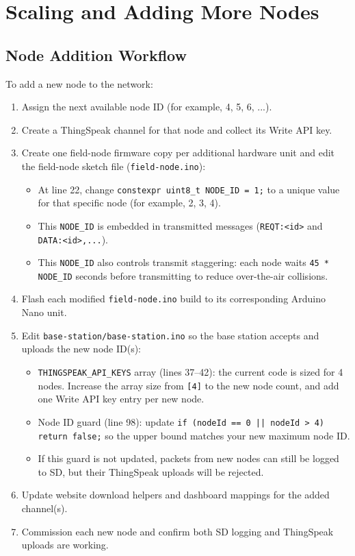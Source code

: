 \documentclass[11pt]{article}
\begin{document}
\section{Scaling and Adding More Nodes}\label{sec:scaling-nodes}
\subsection{Node Addition Workflow}
To add a new node to the network:
\begin{enumerate}
    \item Assign the next available node ID (for example, 4, 5, 6, ...).
    \item Create a ThingSpeak channel for that node and collect its Write API key.
    \item Create one field-node firmware copy per additional hardware unit and edit the field-node sketch file (\texttt{field-node.ino}):
    \begin{itemize}
        \item At line 22, change \texttt{constexpr uint8\_t NODE\_ID = 1;} to a unique value for that specific node (for example, 2, 3, 4).
        \item This \texttt{NODE\_ID} is embedded in transmitted messages (\texttt{REQT:<id>} and \texttt{DATA:<id>,...}).
        \item This \texttt{NODE\_ID} also controls transmit staggering: each node waits \texttt{45 * NODE\_ID} seconds before transmitting to reduce over-the-air collisions.
    \end{itemize}
    \item Flash each modified \texttt{field-node.ino} build to its corresponding Arduino Nano unit.
    \item Edit \texttt{base-station/base-station.ino} so the base station accepts and uploads the new node ID(s):
    \begin{itemize}
        \item \texttt{THINGSPEAK\_API\_KEYS} array (lines 37--42): the current code is sized for 4 nodes. Increase the array size from \texttt{[4]} to the new node count, and add one Write API key entry per new node.
        \item Node ID guard (line 98): update \texttt{if (nodeId == 0 || nodeId > 4) return false;} so the upper bound matches your new maximum node ID.
        \item If this guard is not updated, packets from new nodes can still be logged to SD, but their ThingSpeak uploads will be rejected.
    \end{itemize}
    \item Update website download helpers and dashboard mappings for the added channel(s).
    \item Commission each new node and confirm both SD logging and ThingSpeak uploads are working.
\end{enumerate}
\end{document}
